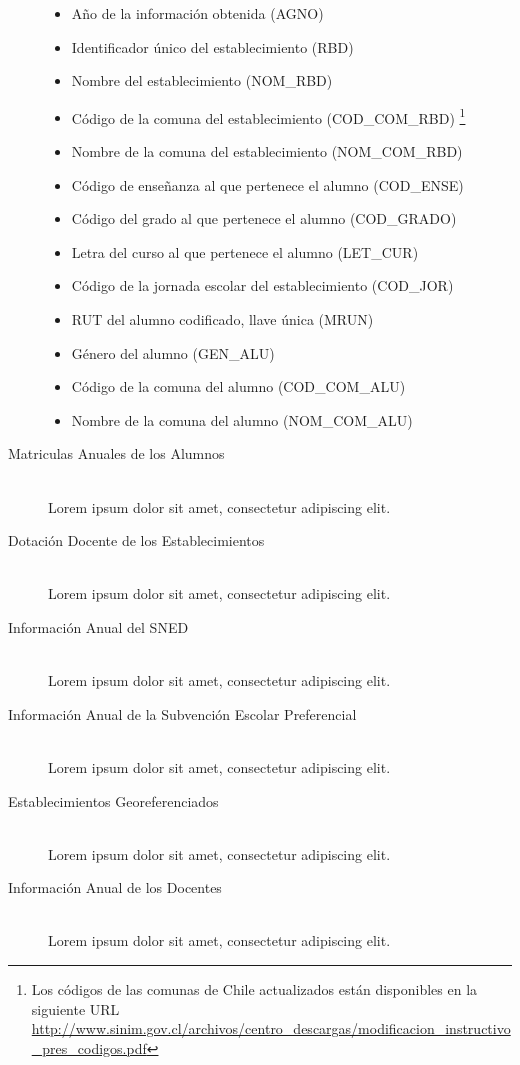 \begin{description}
            \begin{itemize}
              \item Año de la información obtenida (AGNO)
              \item Identificador único del establecimiento (RBD)
              \item Nombre del establecimiento (NOM\_RBD)
              \item Código de la comuna del establecimiento (COD\_COM\_RBD)
              \footnote{Los códigos de las comunas de Chile actualizados están disponibles en la siguiente URL \url{http://www.sinim.gov.cl/archivos/centro_descargas/modificacion_instructivo_pres_codigos.pdf}}
              \item Nombre de la comuna del establecimiento (NOM\_COM\_RBD)
              \item Código de enseñanza al que pertenece el alumno (COD\_ENSE)
              \item Código del grado al que pertenece el alumno (COD\_GRADO)
              \item Letra del curso al que pertenece el alumno (LET\_CUR)
              \item Código de la jornada escolar del establecimiento (COD\_JOR)
              \item RUT del alumno codificado, llave única (MRUN)
              \item Género del alumno (GEN\_ALU)
              \item Código de la comuna del alumno (COD\_COM\_ALU)
              \item Nombre de la comuna del alumno (NOM\_COM\_ALU)
            \end{itemize}
        \item[Matriculas Anuales de los Alumnos] \hfill \\
         Lorem ipsum dolor sit amet, consectetur adipiscing elit. 
      
        \item[Dotación Docente de los Establecimientos] \hfill \\
          Lorem ipsum dolor sit amet, consectetur adipiscing elit. 
    
        \item[Información Anual del SNED] \hfill \\
          Lorem ipsum dolor sit amet, consectetur adipiscing elit. 
          
        \item[Información Anual de la Subvención Escolar Preferencial] \hfill \\
          Lorem ipsum dolor sit amet, consectetur adipiscing elit.  
          
        \item[Establecimientos Georeferenciados] \hfill \\
          Lorem ipsum dolor sit amet, consectetur adipiscing elit.  
          
        \item[Información Anual de los Docentes] \hfill \\
          Lorem ipsum dolor sit amet, consectetur adipiscing elit.
    \end{description}
